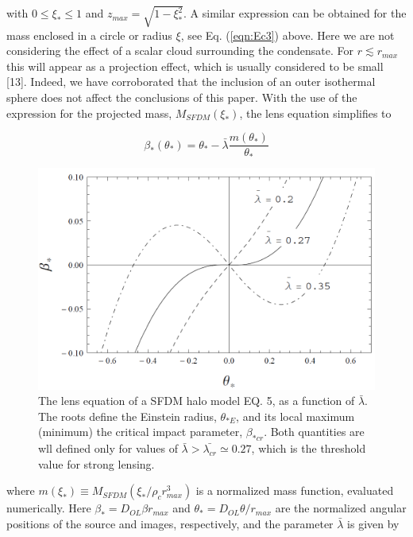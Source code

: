 \documentclass[9.5pt, twocolumn]{article}
\begin{document}
with $0\leq\xi_{*}\leq1$ and $z_{max}=\sqrt{1-\xi_{*}^2}$. A similar expression can be obtained for the mass enclosed in a circle or radius $\xi$, see Eq. (\ref{eqn:Ec3}) above. Here we are not considering the effect of a scalar cloud surrounding the condensate. For $r\lesssim r_{max}$ this will appear as a projection effect, which is usually considered to be small [13]. Indeed, we have corroborated that the inclusion of an outer isothermal sphere does not affect the conclusions of this
paper. With the use of  the expression for the projected mass, $M_{SFDM}(\xi_{*})$, the lens equation simplifies to

\begin{equation}
\beta_{*}\left(\theta_{*}\right)=\theta_{*}-\bar{\lambda} \frac{m\left(\theta_{*}\right)}{\theta_{*}}
\label{eqn:Ec5}
\end{equation}

\begin{figure}
    \centering
    \includegraphics[scale=0.3]{Grafica1.png}
    \caption{The lens equation of a SFDM halo model EQ. 5, as a function of $\bar{\lambda}$. The roots define the Einstein radius, $\theta_{*E}$, and its local maximum (minimum) the critical impact parameter, $\beta_{*cr}$. Both quantities are wll defined only for values of $\bar{\lambda}>\bar{\lambda_{cr}}\simeq 0.27$, which is the threshold value for strong lensing.}
    \label{fig:Grafica1}
\end{figure}
    


where $m(\xi_*)\equiv M_{SFDM}(\xi_*/\rho_cr_{max}^3)$ is a normalized mass
function, evaluated numerically. Here $\beta_{*}=D_{OL}\beta r_{max}$ and $\theta_{*}=D_{OL}\theta/r_{max}$ are the normalized angular positions
of the source and images, respectively, and the parameter $\bar{\lambda}$ is given by
\end{document}
